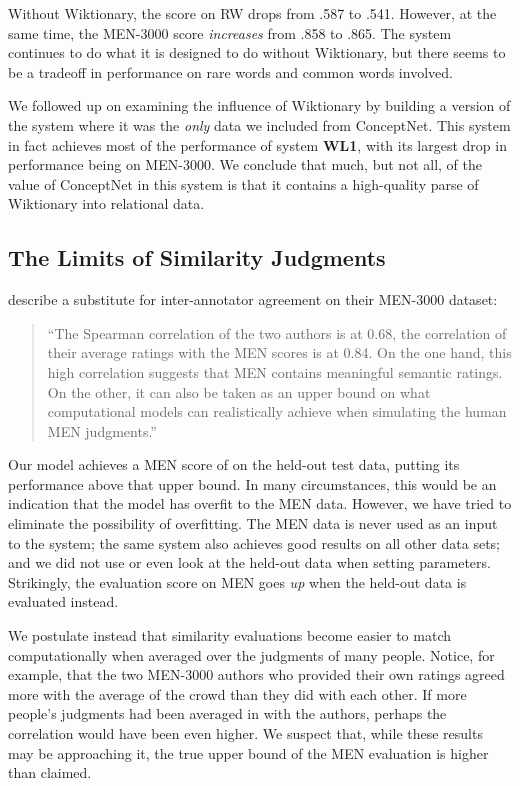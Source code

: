 \documentclass[letterpaper]{article}
\begin{document}
Without Wiktionary, the score on RW drops from .587 to .541. However, at the
same time, the MEN-3000 score {\em increases} from .858 to .865. The system
continues to do what it is designed to do without Wiktionary, but there seems to
be a tradeoff in performance on rare words and common words involved.

We followed up on examining the influence of Wiktionary by building a version of
the system where it was the {\em only} data we included from ConceptNet. This
system in fact achieves most of the performance of system {\bf WL1}, with its
largest drop in performance being on MEN-3000. We conclude that much, but not
all, of the value of ConceptNet in this system is that it contains a
high-quality parse of Wiktionary into relational data.

\subsection{The Limits of Similarity Judgments}

 describe a substitute for inter-annotator agreement on
their MEN-3000 dataset:

\begin{quote}
``The Spearman correlation of the two authors is at 0.68, the correlation of their
average ratings with the MEN scores is at 0.84. On the one hand, this high
correlation suggests that MEN contains meaningful semantic ratings. On the
other, it can also be taken as an upper bound on what computational models can
realistically achieve when simulating the human MEN judgments.''
\end{quote}

Our model achieves a MEN score of \scoreMEN{} on the
held-out test data, putting its performance above that upper bound. In many
circumstances, this would be an indication that the model has overfit to the
MEN data. However, we have tried to eliminate the possibility of overfitting.
The MEN data is never used as an input to the system; the same system also
achieves good results on all other data sets; and we did not use or even
look at the held-out data when setting parameters. Strikingly, the evaluation
score on MEN goes {\em up} when the held-out data is evaluated instead.

We postulate instead that similarity evaluations become easier to match
computationally when averaged over the judgments of many people. Notice, for
example, that the two MEN-3000 authors who provided their own ratings
agreed more with the average of the crowd than they did with each other.
If more people's judgments had been averaged in with the authors, perhaps the
correlation would have been even higher. We suspect that, while these results
may be approaching it, the true upper bound of the MEN evaluation is higher than
claimed.
\end{document}

